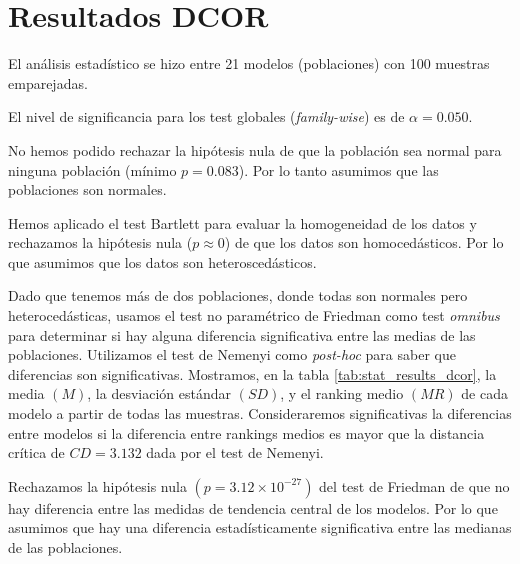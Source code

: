 \documentclass[a4paper,oneside,11pt,leqno]{article}
\begin{document}
	\section{Resultados DCOR}
	\label{sec:results_dcor}
	
	El análisis estadístico se hizo entre 21 modelos (poblaciones) con 100 muestras emparejadas.
	
	El nivel de significancia para los test globales (\textit{family-wise}) es de $\alpha=0.050$.
	
	No hemos podido rechazar la hipótesis nula de que la población sea normal para ninguna población (mínimo $p=0.083$). Por lo tanto asumimos que las poblaciones son normales.
	
	Hemos aplicado el test Bartlett para evaluar la homogeneidad de los datos y rechazamos la hipótesis nula ($p\approx 0$) de que los datos son homocedásticos. Por lo que asumimos que los datos son heteroscedásticos.
	
	Dado que tenemos más de dos poblaciones, donde todas son normales pero heterocedásticas, usamos el test no paramétrico de Friedman como test \textit{omnibus} para determinar si hay alguna diferencia significativa entre las medias de las poblaciones. Utilizamos el test de Nemenyi como \textit{post-hoc} para saber que diferencias son significativas. Mostramos, en la tabla \ref{tab:stat_results_dcor}, la media $(M)$, la desviación estándar $(SD)$, y el ranking medio $(MR)$ de cada modelo a partir de todas las muestras. Consideraremos significativas la diferencias entre modelos si la diferencia entre rankings medios es mayor que la distancia crítica de $CD=3.132$ dada por el test de Nemenyi.

	Rechazamos la hipótesis nula $(p=3.12\times 10^{-27})$ del test de Friedman de que no hay diferencia entre las medidas de tendencia central de los modelos. Por lo que asumimos que hay una diferencia estadísticamente significativa entre las medianas de las poblaciones.
	
\end{document}
